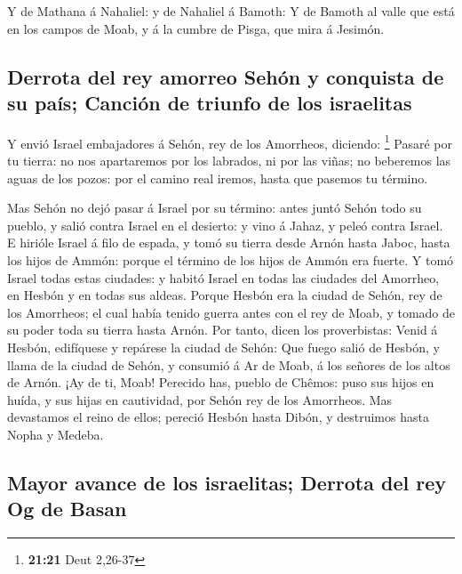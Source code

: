  Y de Mathana á Nahaliel: y de Nahaliel á Bamoth:
 Y de Bamoth al valle que está en los campos de Moab, y á
la cumbre de Pisga, que mira á Jesimón.

\hypertarget{derrota-del-rey-amorreo-sehuxf3n-y-conquista-de-su-pauxeds-canciuxf3n-de-triunfo-de-los-israelitas}{%
\subsection{Derrota del rey amorreo Sehón y conquista de su país;
Canción de triunfo de los
israelitas}\label{derrota-del-rey-amorreo-sehuxf3n-y-conquista-de-su-pauxeds-canciuxf3n-de-triunfo-de-los-israelitas}}

 Y envió Israel embajadores á Sehón, rey de los Amorrheos,
diciendo: \footnote{\textbf{21:21} Deut 2,26-37}  Pasaré
por tu tierra: no nos apartaremos por los labrados, ni por las viñas; no
beberemos las aguas de los pozos: por el camino real iremos, hasta que
pasemos tu término.

 Mas Sehón no dejó pasar á Israel por su término: antes
juntó Sehón todo su pueblo, y salió contra Israel en el desierto: y vino
á Jahaz, y peleó contra Israel.  E hirióle Israel á filo de
espada, y tomó su tierra desde Arnón hasta Jaboc, hasta los hijos de
Ammón: porque el término de los hijos de Ammón era fuerte. 
Y tomó Israel todas estas ciudades: y habitó Israel en todas las
ciudades del Amorrheo, en Hesbón y en todas sus aldeas. 
Porque Hesbón era la ciudad de Sehón, rey de los Amorrheos; el cual
había tenido guerra antes con el rey de Moab, y tomado de su poder toda
su tierra hasta Arnón.  Por tanto, dicen los proverbistas:
Venid á Hesbón, edifíquese y repárese la ciudad de Sehón: 
Que fuego salió de Hesbón, y llama de la ciudad de Sehón, y consumió á
Ar de Moab, á los señores de los altos de Arnón.  ¡Ay de
ti, Moab! Perecido has, pueblo de Chêmos: puso sus hijos en huída, y sus
hijas en cautividad, por Sehón rey de los Amorrheos.  Mas
devastamos el reino de ellos; pereció Hesbón hasta Dibón, y destruimos
hasta Nopha y Medeba.

\hypertarget{mayor-avance-de-los-israelitas-derrota-del-rey-og-de-basan}{%
\subsection{Mayor avance de los israelitas; Derrota del rey Og de
Basan}\label{mayor-avance-de-los-israelitas-derrota-del-rey-og-de-basan}}

